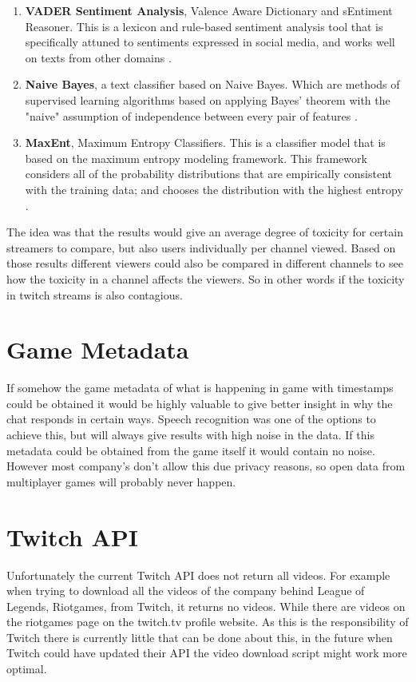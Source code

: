 \documentclass[final]{report}
\begin{document}
\begin{enumerate}
	\item \textbf{VADER Sentiment Analysis}, Valence Aware Dictionary and sEntiment Reasoner. This is a lexicon and rule-based sentiment analysis tool that is specifically attuned to sentiments expressed in social media, and works well on texts from other domains \cite{vader}.
	\item \textbf{Naive Bayes}, a text classifier based on Naive Bayes. Which are methods of supervised learning algorithms based on applying Bayes' theorem with the "naive" assumption of independence between every pair of features \cite{naivebayes}.
	\item \textbf{MaxEnt}, Maximum Entropy Classifiers. This is a classifier model that is based on the maximum entropy modeling framework. This framework considers all of the probability distributions that are empirically consistent with the training data; and chooses the distribution with the highest entropy \cite{maxent}.
\end{enumerate}

The idea was that the results would give an average degree of toxicity for certain streamers to compare, but also users individually per channel viewed. Based on those results different viewers could also be compared in different channels to see how the toxicity in a channel affects the viewers. So in other words if the toxicity in twitch streams is also contagious.

\section{Game Metadata}

If somehow the game metadata of what is happening in game with timestamps could be obtained it would be highly valuable to give better insight in why the chat responds in certain ways. Speech recognition was one of the options to achieve this, but will always give results with high noise in the data. If this metadata could be obtained from the game itself it would contain no noise. However most company's don't allow this due privacy reasons, so open data from multiplayer games will probably never happen.

\section{Twitch API}

Unfortunately the current Twitch API does not return all videos. For example when trying to download all the videos of the company behind League of Legends, Riotgames, from Twitch, it returns no videos. While there are videos on the riotgames page on the twitch.tv profile website. As this is the responsibility of Twitch there is currently little that can be done about this, in the future when Twitch could have updated their API the video download script might work more optimal.
\end{document}

